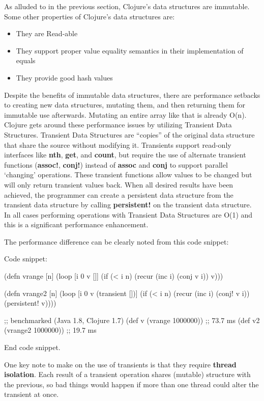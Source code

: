     As alluded to in the previous section, Clojure's data structures are immutable. Some other properties of Clojure's data structures are:
    \begin{itemize}
        \item They are Read-able
        \item They support proper value equality semantics in their implementation of equals
        \item They provide good hash values
    \end{itemize}
    \cite{website:clojure-lang-reference} Despite the benefits of immutable data structures, there are performance setbacks to creating new data structures, mutating them, and then returning them for immutable use afterwards. Mutating an entire array like that is already O(n). Clojure gets around these performance issues by utilizing Transient Data Structures. Transient Data Structures are ``copies'' of the original data structure that share the source without modifying it. Transients support read-only interfaces like \textbf{nth}, \textbf{get}, and \textbf{count}, but require the use of alternate transient functions (\textbf{assoc!}, \textbf{conj!}) instead of \textbf{assoc} and \textbf{conj} to support parallel `changing' operations. These transient functions allow values to be changed but will only return transient values back. When all desired results have been achieved, the programmer can create a persistent data structure from the transient data structure by calling \textbf{persistent!} on the transient data structure. In all cases performing operations with Transient Data Structures are O(1) and this is a significant performance enhancement.
    
    The performance difference can be clearly noted from this code snippet:
    
    Code snippet:
    
    (defn vrange [n]
        (loop [i 0 v []]
            (if (< i n)
                (recur (inc i) (conj v i))
                v)))

    (defn vrange2 [n]
        (loop [i 0 v (transient [])]
            (if (< i n)
                (recur (inc i) (conj! v i))
                (persistent! v))))

    ;; benchmarked (Java 1.8, Clojure 1.7)
    (def v (vrange 1000000))    ;; 73.7 ms
    (def v2 (vrange2 1000000))  ;; 19.7 ms


    End code snippet.
    
    One key note to make on the use of transients is that they require \textbf{thread isolation}. Each result of a transient operation shares (mutable) structure with the previous, so bad things would happen if more than one thread could alter the transient at once. \cite{website:clojure-lang-reference}

